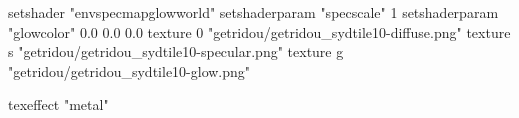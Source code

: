 setshader "envspecmapglowworld"
setshaderparam "specscale" 1
setshaderparam "glowcolor" 0.0 0.0 0.0
texture 0 "getridou/getridou_sydtile10-diffuse.png"
texture s "getridou/getridou_sydtile10-specular.png"
texture g "getridou/getridou_sydtile10-glow.png"

texeffect "metal"

